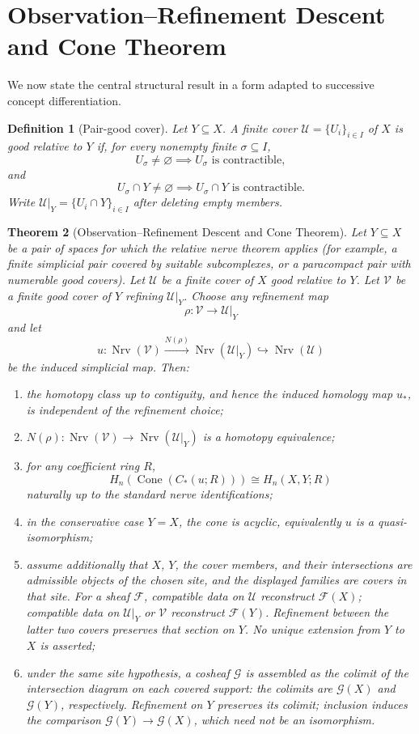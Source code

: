 \documentclass[11pt]{article}
\newtheorem{theorem}{Theorem}[section]
\newtheorem{definition}[theorem]{Definition}
\newcommand{\Cone}{\operatorname{Cone}}
\newcommand{\Nrv}{\operatorname{Nrv}}
\begin{document}
\section{Observation--Refinement Descent and Cone Theorem}

We now state the central structural result in a form adapted to successive concept differentiation.

\begin{definition}[Pair-good cover]
Let $Y\subseteq X$.  A finite cover $\mathcal U=\{U_i\}_{i\in I}$ of $X$ is \emph{good relative to $Y$} if, for every nonempty finite $\sigma\subseteq I$,
\[
U_\sigma\neq\varnothing\implies U_\sigma\text{ is contractible},
\]
and
\[
U_\sigma\cap Y\neq\varnothing\implies U_\sigma\cap Y\text{ is contractible}.
\]
Write $\mathcal U|_Y=\{U_i\cap Y\}_{i\in I}$ after deleting empty members.
\end{definition}

\begin{theorem}[Observation--Refinement Descent and Cone Theorem]\label{thm:main}
Let $Y\subseteq X$ be a pair of spaces for which the relative nerve theorem applies (for example, a finite simplicial pair covered by suitable subcomplexes, or a paracompact pair with numerable good covers).  Let $\mathcal U$ be a finite cover of $X$ good relative to $Y$.  Let $\mathcal V$ be a finite good cover of $Y$ refining $\mathcal U|_Y$.  Choose any refinement map
\[
\rho:\mathcal V\longrightarrow\mathcal U|_Y
\]
and let
\[
u:
\Nrv(\mathcal V)\xrightarrow{N(\rho)}\Nrv(\mathcal U|_Y)
\hookrightarrow\Nrv(\mathcal U)
\]
be the induced simplicial map.  Then:
\begin{enumerate}[label=(\alph*)]
\item the homotopy class up to contiguity, and hence the induced homology map $u_*$, is independent of the refinement choice;
\item $N(\rho):\Nrv(\mathcal V)\to\Nrv(\mathcal U|_Y)$ is a homotopy equivalence;
\item for any coefficient ring $R$,
\[
H_n\!\left(\Cone(C_*(u;R))\right)
\cong H_n(X,Y;R)
\]
naturally up to the standard nerve identifications;
\item in the conservative case $Y=X$, the cone is acyclic, equivalently $u$ is a quasi-isomorphism;
\item assume additionally that $X$, $Y$, the cover members, and their
intersections are admissible objects of the chosen site, and the displayed
families are covers in that site.  For a sheaf $\mathcal F$, compatible data
on $\mathcal U$ reconstruct $\mathcal F(X)$; compatible data on
$\mathcal U|_Y$ or $\mathcal V$ reconstruct $\mathcal F(Y)$.
Refinement between the latter two covers preserves that section on $Y$.
No unique extension from $Y$ to $X$ is asserted;
\item under the same site hypothesis, a cosheaf $\mathcal G$ is assembled
as the colimit of the intersection diagram on each covered support: the
colimits are $\mathcal G(X)$ and $\mathcal G(Y)$, respectively.
Refinement on $Y$ preserves its colimit; inclusion induces the comparison
$\mathcal G(Y)\to\mathcal G(X)$, which need not be an isomorphism.
\end{enumerate}
\end{theorem}
\end{document}
